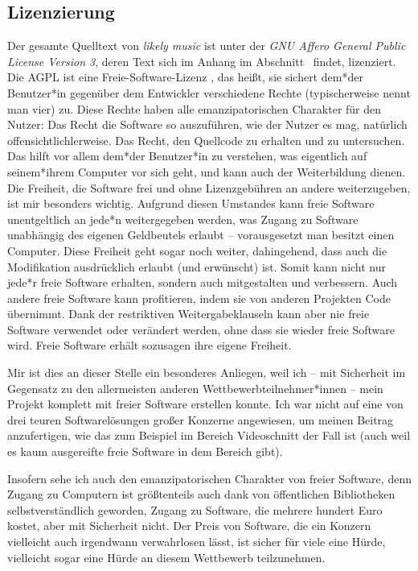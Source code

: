 \documentclass[a4paper,twocolumn]{article}
\begin{document}
\subsection*{Lizenzierung}

Der gesamte Quelltext von {\it likely music} ist unter der
{\it GNU Affero General Public License Version 3}, deren Text sich im Anhang
im Abschnitt~ findet, lizenziert. Die AGPL ist eine
Freie-Software-Lizenz \cite{gnu_free_software}, das heißt, sie sichert dem*der
Benutzer*in gegenüber dem Entwickler verschiedene Rechte (typischerweise nennt man
vier) zu. Diese Rechte haben alle emanzipatorischen Charakter für den Nutzer:
Das Recht die Software so auszuführen, wie der Nutzer es mag, natürlich
offensichtlichlerweise. Das Recht, den Quellcode zu erhalten und zu untersuchen.
Das hilft vor allem dem*der Benutzer*in zu verstehen, was eigentlich auf
seinem*ihrem Computer vor sich geht, und kann auch der Weiterbildung dienen. Die
Freiheit, die Software frei und ohne Lizenzgebühren an andere weiterzugeben, ist
mir besonders wichtig. Aufgrund diesen Umstandes kann freie Software
unentgeltlich an jede*n weitergegeben werden, was Zugang zu Software unabhängig
des eigenen Geldbeutels erlaubt -- vorausgesetzt man besitzt einen Computer.
Diese Freiheit geht sogar noch weiter, dahingehend, dass auch die Modifikation
ausdrücklich erlaubt (und erwünscht) ist. Somit kann nicht nur jede*r freie
Software erhalten, sondern auch mitgestalten und verbessern. Auch andere freie
Software kann profitieren, indem sie von anderen Projekten Code übernimmt. Dank
der restriktiven Weitergabeklauseln kann aber nie freie Software verwendet oder
verändert werden, ohne dass sie wieder freie Software wird. Freie Software
erhält sozusagen ihre eigene Freiheit.

Mir ist dies an dieser Stelle ein besonderes Anliegen, weil ich -- mit
Sicherheit im Gegensatz zu den allermeisten anderen Wettbewerbteilnehmer*innen
-- mein Projekt komplett mit freier Software erstellen konnte. Ich war nicht auf
eine von drei teuren Softwarelösungen großer Konzerne angewiesen, um meinen
Beitrag anzufertigen, wie das zum Beispiel im Bereich Videoschnitt der Fall ist
(auch weil es kaum ausgereifte freie Software in dem Bereich gibt).

Insofern sehe ich auch den emanzipatorischen Charakter von freier Software, denn
Zugang zu Computern ist größtenteils auch dank von öffentlichen Bibliotheken
selbstverständlich geworden, Zugang zu Software, die mehrere hundert Euro
kostet, aber mit Sicherheit nicht. Der Preis von Software, die ein Konzern
vielleicht auch irgendwann verwahrlosen lässt, ist sicher für viele eine Hürde,
vielleicht sogar eine Hürde an diesem Wettbewerb teilzunehmen.
\end{document}
